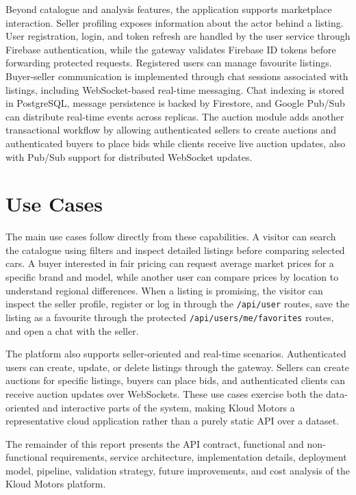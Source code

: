 Beyond catalogue and analysis features, the application supports marketplace interaction. Seller profiling exposes information about the actor behind a listing. User registration, login, and token refresh are handled by the user service through Firebase authentication, while the gateway validates Firebase ID tokens before forwarding protected requests. Registered users can manage favourite listings. Buyer-seller communication is implemented through chat sessions associated with listings, including WebSocket-based real-time messaging. Chat indexing is stored in PostgreSQL, message persistence is backed by Firestore, and Google Pub/Sub can distribute real-time events across replicas. The auction module adds another transactional workflow by allowing authenticated sellers to create auctions and authenticated buyers to place bids while clients receive live auction updates, also with Pub/Sub support for distributed WebSocket updates.

\section{Use Cases}

The main use cases follow directly from these capabilities. A visitor can search the catalogue using filters and inspect detailed listings before comparing selected cars. A buyer interested in fair pricing can request average market prices for a specific brand and model, while another user can compare prices by location to understand regional differences. When a listing is promising, the visitor can inspect the seller profile, register or log in through the \texttt{/api/user} routes, save the listing as a favourite through the protected \texttt{/api/users/me/favorites} routes, and open a chat with the seller.

The platform also supports seller-oriented and real-time scenarios. Authenticated users can create, update, or delete listings through the gateway. Sellers can create auctions for specific listings, buyers can place bids, and authenticated clients can receive auction updates over WebSockets. These use cases exercise both the data-oriented and interactive parts of the system, making Kloud Motors a representative cloud application rather than a purely static API over a dataset.

The remainder of this report presents the API contract, functional and non-functional requirements, service architecture, implementation details, deployment model, pipeline, validation strategy, future improvements, and cost analysis of the Kloud Motors platform.
